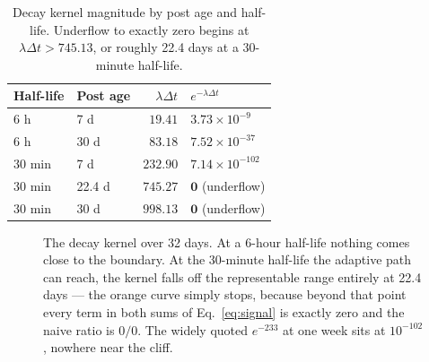 \documentclass[11pt]{article}
\begin{document}
\begin{table}[htbp]
\centering
\caption[Decay kernel magnitude by post age and half-life]{Decay kernel magnitude by post age and half-life. Underflow to exactly
zero begins at $\lambda \Delta t > 745.13$, or roughly 22.4 days at a 30-minute
half-life.}
\label{tab:underflow}
\small
\begin{tabular}{@{}llrl@{}}
\toprule
Half-life & Post age & $\lambda \Delta t$ & $e^{-\lambda \Delta t}$ \\
\midrule
6 h    & 7 d    & $19.41$  & $3.73 \times 10^{-9}$ \\
6 h    & 30 d   & $83.18$  & $7.52 \times 10^{-37}$ \\
30 min & 7 d    & $232.90$ & $7.14 \times 10^{-102}$ \\
30 min & 22.4 d & $745.27$ & $\mathbf{0}$ (underflow) \\
30 min & 30 d   & $998.13$ & $\mathbf{0}$ (underflow) \\
\bottomrule
\end{tabular}
\end{table}

\begin{figure}[htbp]
\centering
{}
\caption[The decay kernel and the float64 underflow cliff]{The decay kernel over 32 days. At a 6-hour half-life nothing comes close
to the boundary. At the 30-minute half-life the adaptive path can reach, the
kernel falls off the representable range entirely at 22.4 days --- the orange
curve simply stops, because beyond that point every term in both sums of
Eq.~\ref{eq:signal} is exactly zero and the naive ratio is $0/0$. The widely
quoted $e^{-233}$ at one week sits at $10^{-102}$, nowhere near the cliff.}
\label{fig:underflow}
\end{figure}
\end{document}
